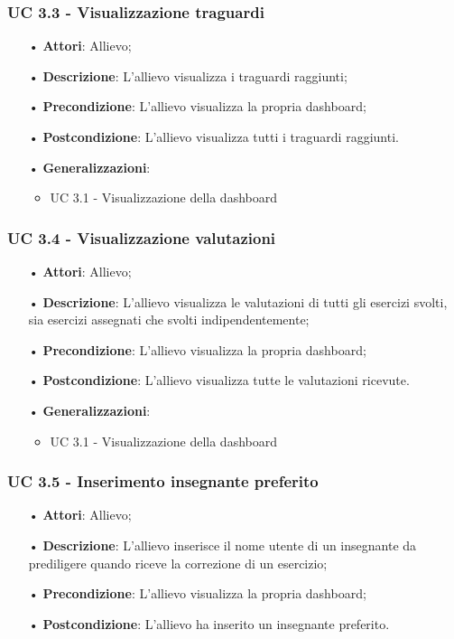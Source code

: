 \subsubsection{UC 3.3 - Visualizzazione traguardi}
\begin{itemize}
\item[•]\textbf{Attori}: Allievo;
\item[•]\textbf{Descrizione}: L'allievo visualizza i traguardi raggiunti;
\item[•]\textbf{Precondizione}: L'allievo visualizza la propria dashboard;
\item[•]\textbf{Postcondizione}: L'allievo visualizza tutti i traguardi raggiunti.
\item[•]\textbf{Generalizzazioni}:
\begin{itemize}
\item UC 3.1 - Visualizzazione della dashboard
\end{itemize}
\end{itemize}

\subsubsection{UC 3.4 - Visualizzazione valutazioni}
\begin{itemize}
\item[•]\textbf{Attori}: Allievo;
\item[•]\textbf{Descrizione}: L'allievo visualizza le valutazioni di tutti gli esercizi svolti, sia esercizi assegnati che svolti indipendentemente;
\item[•]\textbf{Precondizione}: L'allievo visualizza la propria dashboard;
\item[•]\textbf{Postcondizione}: L'allievo visualizza tutte le valutazioni ricevute.
\item[•]\textbf{Generalizzazioni}:
\begin{itemize}
\item UC 3.1 - Visualizzazione della dashboard
\end{itemize}
\end{itemize}

\subsubsection{UC 3.5 - Inserimento insegnante preferito}
\begin{itemize}
\item[•]\textbf{Attori}: Allievo;
\item[•]\textbf{Descrizione}: L'allievo inserisce il nome utente di un insegnante da prediligere quando riceve la correzione di un esercizio;
\item[•]\textbf{Precondizione}: L'allievo visualizza la propria dashboard;
\item[•]\textbf{Postcondizione}: L'allievo ha inserito un insegnante preferito.
\end{itemize}

